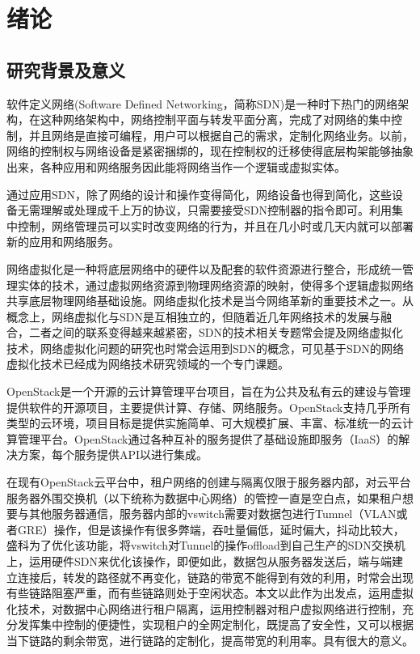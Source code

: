 
\chapter{绪论}
\section{研究背景及意义}
软件定义网络(Software Defined Networking，简称SDN)是一种时下热门的网络架构，在这种网络架构中，网络控制平面与转发平面分离，完成了对网络的集中控制，并且网络是直接可编程，用户可以根据自己的需求，定制化网络业务。以前，网络的控制权与网络设备是紧密捆绑的，现在控制权的迁移使得底层构架能够抽象出来，各种应用和网络服务因此能将网络当作一个逻辑或虚拟实体。

通过应用SDN，除了网络的设计和操作变得简化，网络设备也得到简化，这些设备无需理解或处理成千上万的协议，只需要接受SDN控制器的指令即可。利用集中控制，网络管理员可以实时改变网络的行为，并且在几小时或几天内就可以部署新的应用和网络服务。

网络虚拟化是一种将底层网络中的硬件以及配套的软件资源进行整合，形成统一管理实体的技术，通过虚拟网络资源到物理网络资源的映射，使得多个逻辑虚拟网络共享底层物理网络基础设施。网络虚拟化技术是当今网络革新的重要技术之一。从概念上，网络虚拟化与SDN是互相独立的，但随着近几年网络技术的发展与融合，二者之间的联系变得越来越紧密，SDN的技术相关专题常会提及网络虚拟化技术，网络虚拟化问题的研究也时常会运用到SDN的概念，可见基于SDN的网络虚拟化技术已经成为网络技术研究领域的一个专门课题。

OpenStack是一个开源的云计算管理平台项目，旨在为公共及私有云的建设与管理提供软件的开源项目，主要提供计算、存储、网络服务。OpenStack支持几乎所有类型的云环境，项目目标是提供实施简单、可大规模扩展、丰富、标准统一的云计算管理平台。OpenStack通过各种互补的服务提供了基础设施即服务（IaaS）的解决方案，每个服务提供API以进行集成。

在现有OpenStack云平台中，租户网络的创建与隔离仅限于服务器内部，对云平台服务器外围交换机（以下统称为数据中心网络）的管控一直是空白点，如果租户想要与其他服务器通信，服务器内部的vswitch需要对数据包进行Tumnel（VLAN或者GRE）操作，但是该操作有很多弊端，吞吐量偏低，延时偏大，抖动比较大，盛科为了优化该功能，将vswitch对Tunnel的操作offload到自己生产的SDN交换机上，运用硬件SDN来优化该操作，即便如此，数据包从服务器发送后，端与端建立连接后，转发的路径就不再变化，链路的带宽不能得到有效的利用，时常会出现有些链路阻塞严重，而有些链路则处于空闲状态。本文以此作为出发点，运用虚拟化技术，对数据中心网络进行租户隔离，运用控制器对租户虚拟网络进行控制，充分发挥集中控制的便捷性，实现租户的全网定制化，既提高了安全性，又可以根据当下链路的剩余带宽，进行链路的定制化，提高带宽的利用率。具有很大的意义。

